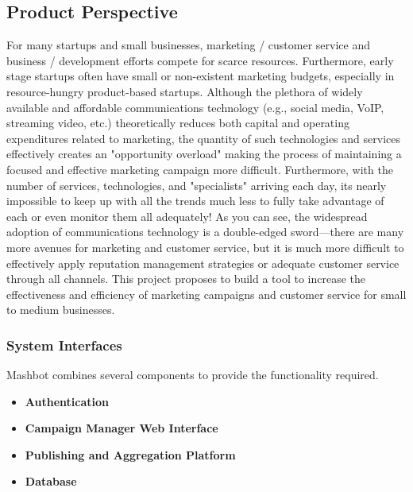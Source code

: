 \documentclass{article}
\begin{document}
     \subsection{Product Perspective}
		For many startups and small businesses, marketing /
                customer service and business / development efforts
                compete for scarce resources.  Furthermore, early
                stage startups often have small or non-existent
                marketing budgets, especially in resource-hungry
                product-based startups.  Although the plethora of
                widely available and affordable communications
                technology (e.g., social media, VoIP, streaming video,
                etc.) theoretically reduces both capital and operating
                expenditures related to marketing, the quantity of
                such technologies and services effectively creates an
                "opportunity overload" making the process of
                maintaining a focused and effective marketing campaign
                more difficult.  Furthermore, with the number of
                services, technologies, and "specialists" arriving
                each day, its nearly impossible to keep up with all
                the trends much less to fully take advantage of each
                or even monitor them all adequately! As you can see,
                the widespread adoption of communications technology
                is a double-edged sword---there are many more avenues
                for marketing and customer service, but it is much
                more difficult to effectively apply reputation
                management strategies or adequate customer service
                through all channels. This project proposes to build a
                tool to increase the effectiveness and efficiency of
                marketing campaigns and customer service for small to
                medium businesses.
		\subsubsection{System Interfaces} %
			Mashbot combines several components to provide the functionality
			required.
			\begin{itemize}
				\item \textbf{Authentication}
				\item \textbf{Campaign Manager Web Interface}
				\item \textbf{Publishing and Aggregation
                                  Platform}
				\item \textbf{Database}
			\end{itemize}
\end{document}
